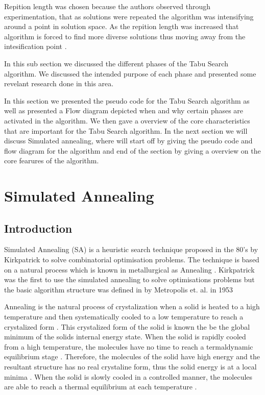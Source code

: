 Repition length was chosen because the authors observed through experimentation, that as solutions were repeated the algorithm was intensifying around a point in solution space. As the repition length was increased that algorithm is forced to find more diverse solutions thus moving away from the intesification point \cite{SelfControllingReactiveTabu}.

In this sub section we discussed the different phases of the Tabu Search algorithm. We discussed the intended purpose of each phase and presented some revelant research done in this area.

In this section we presented the pseudo code for the Tabu Search algorithm as well as presented a Flow diagram depicted when and why certain phases are activated in the algorithm. We then gave a overview of the core characteristics that are important for the Tabu Search algorithm. In the next section we will discuss Simulated annealing, where will start off by giving the pseudo code and flow diagram for the algorithm and end of the section by giving a overview on the core fearures of the algorithm.

\section{Simulated Annealing}
\subsection{Introduction}
Simulated Annealing (SA) is a heuristic search technique proposed in the 80's by Kirkpatrick to solve combinatorial optimisation problems. The technique is based on a natural process which is known in metallurgical as Annealing \cite{CurveFittingSA,SASingleMultiObj,TempCyclingSA,ChaosSA}. Kirkpatrick was the first to use the simulated annealing to solve optimisations problems but the basic algorithm structure was defined in by Metropolis et. al. in 1953 \cite{CurveFittingSA,VeryFastSAImageEnchancement}

Annealing is the natural process of crystalization when a solid is heated to a high temperature and then systematically cooled to a low temperature to reach a crystalized form \cite{CurveFittingSA,NewSAs,MobileRobotSA,ConstantTempSA}. This crystalized form of the solid is known the be the global minimum of the solids internal energy state. When the solid is rapidly cooled from a high temperature, the molecules have no time to reach a termaldynamic equilibrium stage \cite{CurveFittingSA,NewSAs,MobileRobotSA,ConstantTempSA}. Therefore, the molecules of the solid have high energy and the resultant structure has no real crystaline form, thus the solid energy is at a local minima \cite{CurveFittingSA,NewSAs,MobileRobotSA}. When the solid is slowly cooled in a controlled manner, the molecules are able to reach a thermal equilibrium at each temperature \cite{ChaosSA,CurveFittingSA,NewSAs,MobileRobotSA,ConstantTempSA}.

